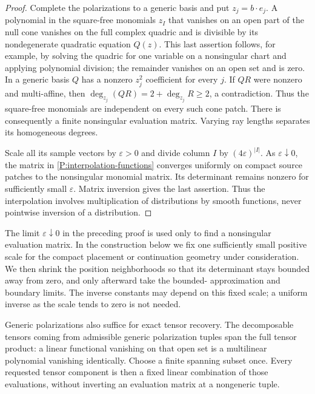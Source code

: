 \begin{proof}
Complete the polarizations to a generic basis and put $z_j=b\cdot e_j$.
A polynomial in the square-free monomials $z_I$ that vanishes on an open
part of the null cone vanishes on the full complex quadric and is
divisible by its nondegenerate quadratic equation $Q(z)$.  This last
assertion follows, for example, by solving the quadric for one variable
on a nonsingular chart and applying polynomial division; the remainder
vanishes on an open set and is zero.  In a generic basis $Q$ has a nonzero
$z_j^2$ coefficient for every $j$.  If $Q R$ were nonzero and
multi-affine, then
$\deg_{z_j}(QR)=2+\deg_{z_j}R\geq2$, a contradiction.  Thus the
square-free monomials are independent on every such cone patch.
There is consequently a finite nonsingular evaluation matrix.  Varying
ray lengths separates its homogeneous degrees.

Scale all its sample vectors by $\varepsilon>0$ and divide column $I$
by $(4\varepsilon)^{|I|}$.  As $\varepsilon\downarrow0$, the matrix in
\eqref{P:interpolation-functions} converges uniformly on compact source
patches to the nonsingular monomial matrix.  Its determinant remains
nonzero for sufficiently small $\varepsilon$.  Matrix inversion gives
the last assertion.  Thus the interpolation involves multiplication of
distributions by smooth functions, never pointwise inversion of a
distribution.
\end{proof}

The limit $\varepsilon\downarrow0$ in the preceding proof is used
only to find a nonsingular evaluation matrix.  In the construction
below we fix one sufficiently small positive scale for the compact
placement or continuation geometry under consideration.  We then
shrink the position neighborhoods so that its determinant stays
bounded away from zero, and only afterward take the bounded-
approximation and boundary limits.  The inverse constants may depend
on this fixed scale; a uniform inverse as the scale tends to zero is
not needed.

Generic polarizations also suffice for exact tensor recovery.  The
decomposable tensors coming from admissible generic polarization
tuples span the full tensor product: a linear functional vanishing on
that open set is a multilinear polynomial vanishing identically.
Choose a finite spanning subset once.  Every requested tensor
component is then a fixed linear combination of those evaluations,
without inverting an evaluation matrix at a nongeneric tuple.

